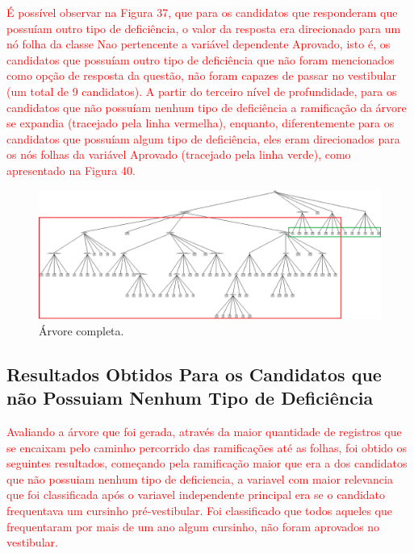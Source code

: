 \par
\textcolor{red}{É possível observar na Figura 37, que para os candidatos que responderam que possuíam outro tipo de deficiência, o valor da resposta era direcionado para um nó folha da classe Nao pertencente a variável dependente Aprovado, isto é, os candidatos que possuíam outro tipo de deficiência que não foram mencionados como opção de resposta da questão, não foram capazes de passar no vestibular (um total de 9 candidatos). A partir do terceiro nível de profundidade, para os candidatos que não possuíam nenhum tipo de deficiência a ramificação da árvore se expandia (tracejado pela linha vermelha), enquanto, diferentemente para os candidatos que possuíam algum tipo de deficiência, eles eram direcionados para os nós folhas da variável Aprovado (tracejado pela linha verde), como apresentado na Figura 40.}

\par
\begin{figure}[!htp]
	\begin{center}
    \caption{\label{fig:waveform_fig} Árvore completa.}
	\includegraphics[scale=0.45]{Figuras/Arvore_completa.png}
	\end{center}
\end{figure}


\subsection{Resultados Obtidos Para os Candidatos que não Possuiam Nenhum Tipo de Deficiência}


\par
\textcolor{red}{Avaliando a árvore que foi gerada, através da maior quantidade de registros que se encaixam pelo caminho percorrido das ramificações até as folhas, foi obtido os seguintes resultados, começando pela ramificação maior que era a dos candidatos que não possuiam nenhum tipo de deficiencia, a variavel com maior relevancia que foi classificada após o variavel independente principal era se o candidato frequentava um cursinho pré-vestibular. Foi classificado que todos aqueles que frequentaram por mais de um ano algum cursinho, não foram aprovados no vestibular.}

